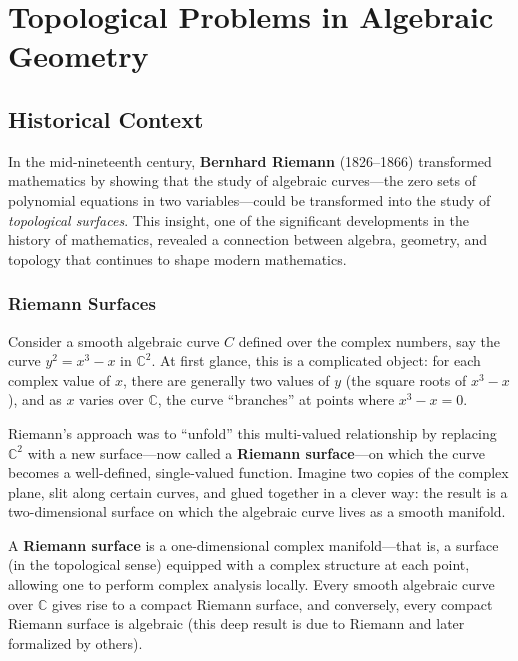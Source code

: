 
\chapter{Topological Problems in Algebraic Geometry}

\section{Historical Context}

In the mid-nineteenth century, \textbf{Bernhard Riemann} (1826--1866) transformed mathematics by showing that the study of algebraic curves---the zero sets of polynomial equations in two variables---could be transformed into the study of \emph{topological surfaces}. This insight, one of the significant developments in the history of mathematics, revealed a connection between algebra, geometry, and topology that continues to shape modern mathematics.

\subsection{Riemann Surfaces}

Consider a smooth algebraic curve $C$ defined over the complex numbers, say the curve $y^2 = x^3 - x$ in $\mathbb{C}^2$. At first glance, this is a complicated object: for each complex value of $x$, there are generally two values of $y$ (the square roots of $x^3 - x$), and as $x$ varies over $\mathbb{C}$, the curve ``branches'' at points where $x^3 - x = 0$.

Riemann's approach was to ``unfold'' this multi-valued relationship by replacing $\mathbb{C}^2$ with a new surface---now called a \textbf{Riemann surface}---on which the curve becomes a well-defined, single-valued function. Imagine two copies of the complex plane, slit along certain curves, and glued together in a clever way: the result is a two-dimensional surface on which the algebraic curve lives as a smooth manifold.

\begin{definition}
A \textbf{Riemann surface} is a one-dimensional complex manifold---that is, a surface (in the topological sense) equipped with a complex structure at each point, allowing one to perform complex analysis locally. Every smooth algebraic curve over $\mathbb{C}$ gives rise to a compact Riemann surface, and conversely, every compact Riemann surface is algebraic (this deep result is due to Riemann and later formalized by others).
\end{definition}

